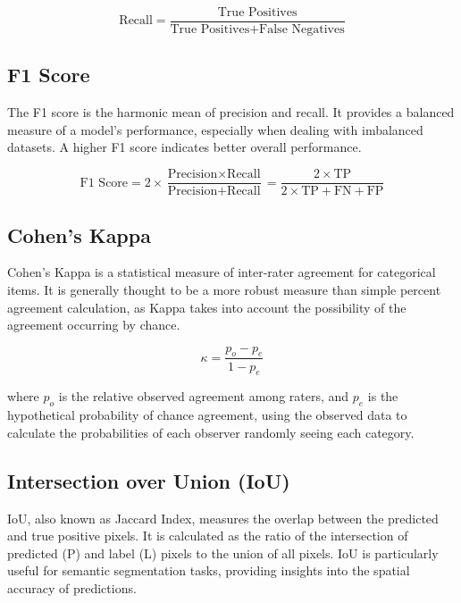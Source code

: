 \begin{equation*}
    \text{Recall} = \frac{\text{True Positives}}{\text{True Positives}
        + \text{False Negatives}}
\end{equation*}

\subsection{F1 Score}

The F1 score is the harmonic mean of precision and recall. It provides
a balanced measure of a model's performance, especially when dealing with
imbalanced datasets. A higher F1 score indicates better overall performance.

\begin{equation*}
    \text{F1 Score} = 2 \times \frac{\text{Precision} \times
        \text{Recall}}{\text{Precision} + \text{Recall}} = \frac{2\times
        \text{TP}}{2\times \text{TP} + \text{FN} + \text{FP}}
\end{equation*}

\subsection{Cohen's Kappa}

Cohen's Kappa is a statistical measure of inter-rater agreement for
categorical items. It is generally thought to be a more robust measure than
simple percent agreement calculation, as Kappa takes into account the
possibility of the agreement occurring by chance.

\begin{equation*}
    \kappa = \frac{p_o - p_e}{1 - p_e}
\end{equation*}

where $p_o$ is the relative observed agreement among raters, and $p_e$ is the
hypothetical probability of chance agreement, using the observed data to
calculate the probabilities of each observer randomly seeing each category.

\subsection{Intersection over Union (IoU)}

IoU, also known as Jaccard Index, measures the overlap between the
predicted and true positive pixels. It is calculated as the ratio of the
intersection of predicted (P) and label (L) pixels to the union of all pixels.
IoU is particularly useful for semantic segmentation tasks, providing insights
into the spatial accuracy of predictions.

